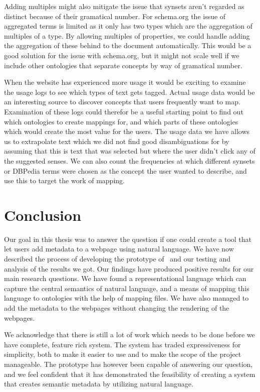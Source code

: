 Adding multiples might also mitigate the issue that synsets aren't regarded as distinct because of their gramatical number.
For schema.org the issue of aggregated terms is limited as it only has two types which are the aggregation of multiples of a type.
By allowing multiples of properties, we could handle adding the aggregation of these behind to the document automatically.
This would be a good solution for the issue with schema.org, but it might not scale well if we include other ontologies
that separate concepts by way of gramatical number.

When the website has experienced more usage it would be exciting to examine the usage logs to see which types of text gets tagged.
Actual usage data would be an interesting source to discover concepts that users frequently want to map.
Examination of these logs could therefor be a useful starting point to find out which ontologies to create mappings for,
and which parts of these ontologies which would create the most value for the users.
The usage data we have allows us to extrapolate text which we did not find good disambiguations for
by assuming that this is text that was selected but where the user didn't click any of the suggested senses.
We can also count the frequencies at which different synsets or DBPedia terms were chosen as the concept the
user wanted to describe, and use this to target the work of mapping.

\section{Conclusion}
Our goal in this thesis was to answer the question if one could create a tool that let users add metadata to a webpage using
natural language.
We have now described the process of developing the prototype of \theartefact\ and our testing and analysis of the results we got.
Our findings have produced positive results for our main research questions.
We have found a representational language which can capture the central semantics of natural language,
and a means of mapping this language to ontologies with the help of mapping files.
We have also managed to add the metadata to the webpages without changing the rendering of the webpages.

We acknowledge that there is still a lot of work which needs to be done before we have complete, feature rich system.
The system has traded expressiveness for simplicity, both to make it easier to use and to make the scope of the project manageable.
The prototype has however been capable of answering our question,
and we feel confident that it has demonstrated the feasibility of creating a system that creates semantic metadata by
utilizing natural language.
